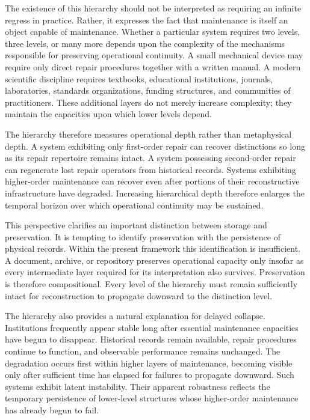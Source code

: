 \documentclass[12pt,oneside]{article}
\theoremstyle{plain}
\theoremstyle{definition}
\theoremstyle{remark}
\theoremstyle{plain}
\begin{document}
The existence of this hierarchy should not be interpreted as requiring an infinite regress in
practice. Rather, it expresses the fact that maintenance is itself an object capable of maintenance.
Whether a particular system requires two levels, three levels, or many more depends upon the
complexity of the mechanisms responsible for preserving operational continuity. A small mechanical
device may require only direct repair procedures together with a written manual. A modern scientific
discipline requires textbooks, educational institutions, journals, laboratories, standards
organizations, funding structures, and communities of practitioners. These additional layers do not
merely increase complexity; they maintain the capacities upon which lower levels depend.

The hierarchy therefore measures operational depth rather than metaphysical depth. A system
exhibiting only first-order repair can recover distinctions so long as its repair repertoire remains
intact. A system possessing second-order repair can regenerate lost repair operators from historical
records. Systems exhibiting higher-order maintenance can recover even after portions of their
reconstructive infrastructure have degraded. Increasing hierarchical depth therefore enlarges the
temporal horizon over which operational continuity may be sustained.

This perspective clarifies an important distinction between storage and preservation. It is tempting
to identify preservation with the persistence of physical records. Within the present framework
this identification is insufficient. A document, archive, or repository preserves operational
capacity only insofar as every intermediate layer required for its interpretation also survives.
Preservation is therefore compositional. Every level of the hierarchy must remain sufficiently
intact for reconstruction to propagate downward to the distinction level.

The hierarchy also provides a natural explanation for delayed collapse. Institutions frequently
appear stable long after essential maintenance capacities have begun to disappear. Historical
records remain available, repair procedures continue to function, and observable performance remains
unchanged. The degradation occurs first within higher layers of maintenance, becoming visible only
after sufficient time has elapsed for failures to propagate downward. Such systems exhibit latent
instability. Their apparent robustness reflects the temporary persistence of lower-level structures
whose higher-order maintenance has already begun to fail.
\end{document}
